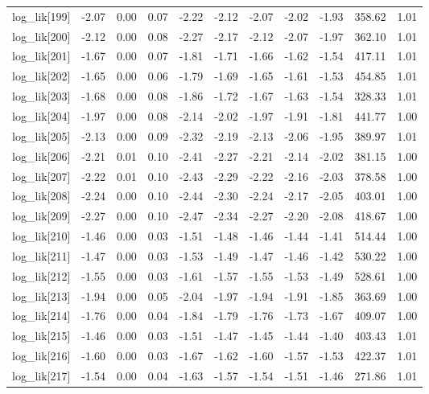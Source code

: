 \begin{table}[ht]
\begin{tabular}{rrrrrrrrrrr}
  log\_lik[199] & -2.07 & 0.00 & 0.07 & -2.22 & -2.12 & -2.07 & -2.02 & -1.93 & 358.62 & 1.01 \\ 
  log\_lik[200] & -2.12 & 0.00 & 0.08 & -2.27 & -2.17 & -2.12 & -2.07 & -1.97 & 362.10 & 1.01 \\ 
  log\_lik[201] & -1.67 & 0.00 & 0.07 & -1.81 & -1.71 & -1.66 & -1.62 & -1.54 & 417.11 & 1.01 \\ 
  log\_lik[202] & -1.65 & 0.00 & 0.06 & -1.79 & -1.69 & -1.65 & -1.61 & -1.53 & 454.85 & 1.01 \\ 
  log\_lik[203] & -1.68 & 0.00 & 0.08 & -1.86 & -1.72 & -1.67 & -1.63 & -1.54 & 328.33 & 1.01 \\ 
  log\_lik[204] & -1.97 & 0.00 & 0.08 & -2.14 & -2.02 & -1.97 & -1.91 & -1.81 & 441.77 & 1.00 \\ 
  log\_lik[205] & -2.13 & 0.00 & 0.09 & -2.32 & -2.19 & -2.13 & -2.06 & -1.95 & 389.97 & 1.01 \\ 
  log\_lik[206] & -2.21 & 0.01 & 0.10 & -2.41 & -2.27 & -2.21 & -2.14 & -2.02 & 381.15 & 1.00 \\ 
  log\_lik[207] & -2.22 & 0.01 & 0.10 & -2.43 & -2.29 & -2.22 & -2.16 & -2.03 & 378.58 & 1.00 \\ 
  log\_lik[208] & -2.24 & 0.00 & 0.10 & -2.44 & -2.30 & -2.24 & -2.17 & -2.05 & 403.01 & 1.00 \\ 
  log\_lik[209] & -2.27 & 0.00 & 0.10 & -2.47 & -2.34 & -2.27 & -2.20 & -2.08 & 418.67 & 1.00 \\ 
  log\_lik[210] & -1.46 & 0.00 & 0.03 & -1.51 & -1.48 & -1.46 & -1.44 & -1.41 & 514.44 & 1.00 \\ 
  log\_lik[211] & -1.47 & 0.00 & 0.03 & -1.53 & -1.49 & -1.47 & -1.46 & -1.42 & 530.22 & 1.00 \\ 
  log\_lik[212] & -1.55 & 0.00 & 0.03 & -1.61 & -1.57 & -1.55 & -1.53 & -1.49 & 528.61 & 1.00 \\ 
  log\_lik[213] & -1.94 & 0.00 & 0.05 & -2.04 & -1.97 & -1.94 & -1.91 & -1.85 & 363.69 & 1.00 \\ 
  log\_lik[214] & -1.76 & 0.00 & 0.04 & -1.84 & -1.79 & -1.76 & -1.73 & -1.67 & 409.07 & 1.00 \\ 
  log\_lik[215] & -1.46 & 0.00 & 0.03 & -1.51 & -1.47 & -1.45 & -1.44 & -1.40 & 403.43 & 1.01 \\ 
  log\_lik[216] & -1.60 & 0.00 & 0.03 & -1.67 & -1.62 & -1.60 & -1.57 & -1.53 & 422.37 & 1.01 \\ 
  log\_lik[217] & -1.54 & 0.00 & 0.04 & -1.63 & -1.57 & -1.54 & -1.51 & -1.46 & 271.86 & 1.01 \\ 

\end{tabular}
\end{table}
